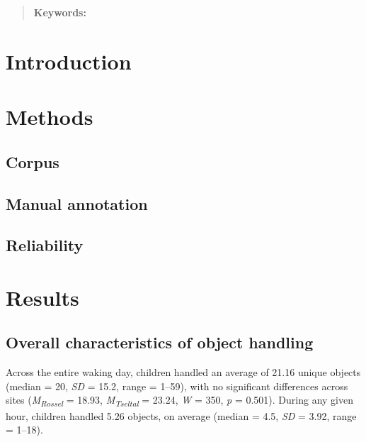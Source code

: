 \documentclass[10pt, letterpaper]{article}
\title{}
\begin{document}
\maketitle

\begin{abstract}


\textbf{Keywords:}

\end{abstract}

\hypertarget{introduction}{%
\section{Introduction}\label{introduction}}

\hypertarget{methods}{%
\section{Methods}\label{methods}}

\hypertarget{corpus}{%
\subsection{Corpus}\label{corpus}}

\hypertarget{manual-annotation}{%
\subsection{Manual annotation}\label{manual-annotation}}

\hypertarget{reliability}{%
\subsection{Reliability}\label{reliability}}

\hypertarget{results}{%
\section{Results}\label{results}}

\hypertarget{overall-characteristics-of-object-handling}{%
\subsection{Overall characteristics of object
handling}\label{overall-characteristics-of-object-handling}}

Across the entire waking day, children handled an average of 21.16
unique objects (median = 20, \emph{SD} = 15.2, range = 1--59), with no
significant differences across sites
(\emph{M}\textsubscript{\emph{Rossel}} = 18.93,
\emph{M}\textsubscript{\emph{Tseltal}} = 23.24, \emph{W} = 350, \emph{p}
= 0.501). During any given hour, children handled 5.26 objects, on
average (median = 4.5, \emph{SD} = 3.92, range = 1--18).
\end{document}
